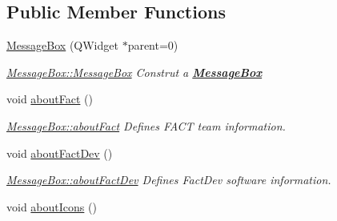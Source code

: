 \subsection*{Public Member Functions}
\begin{DoxyCompactItemize}
\item 
\hyperlink{classMessageBox_a990d6667ca2831882090602c93169b0d}{Message\+Box} (Q\+Widget $\ast$parent=0)
\begin{DoxyCompactList}\small\item\em \hyperlink{classMessageBox_a990d6667ca2831882090602c93169b0d}{Message\+Box\+::\+Message\+Box} Construt a {\bfseries \hyperlink{classMessageBox}{Message\+Box}} \end{DoxyCompactList}\item 
\hypertarget{classMessageBox_ababd93e31998e3eabb1a655f044dea9c}{void \hyperlink{classMessageBox_ababd93e31998e3eabb1a655f044dea9c}{about\+Fact} ()}\label{classMessageBox_ababd93e31998e3eabb1a655f044dea9c}

\begin{DoxyCompactList}\small\item\em \hyperlink{classMessageBox_ababd93e31998e3eabb1a655f044dea9c}{Message\+Box\+::about\+Fact} Defines F\+A\+C\+T team information. \end{DoxyCompactList}\item 
\hypertarget{classMessageBox_a18400f858bdb14e0af856893da73a932}{void \hyperlink{classMessageBox_a18400f858bdb14e0af856893da73a932}{about\+Fact\+Dev} ()}\label{classMessageBox_a18400f858bdb14e0af856893da73a932}

\begin{DoxyCompactList}\small\item\em \hyperlink{classMessageBox_a18400f858bdb14e0af856893da73a932}{Message\+Box\+::about\+Fact\+Dev} Defines Fact\+Dev software information. \end{DoxyCompactList}\item 
\hypertarget{classMessageBox_a9ffe14eb394b925e2a9a5a47c5f63238}{void \hyperlink{classMessageBox_a9ffe14eb394b925e2a9a5a47c5f63238}{about\+Icons} ()}\label{classMessageBox_a9ffe14eb394b925e2a9a5a47c5f63238}


\end{DoxyCompactItemize}
